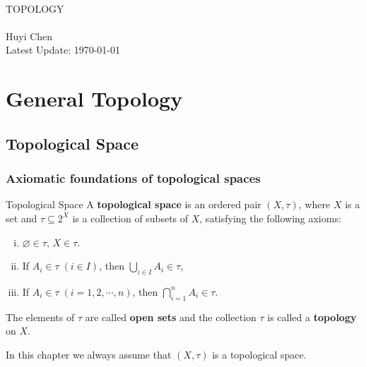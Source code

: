 \documentclass{report}
\begin{document}
\begin{titlepage}
	\begin{center}
		~\\
		\vspace{6em}
		\textsc{\Huge TOPOLOGY}
		~\\
		\vspace{2.5em}
		{\Large }
		~\\
		\vspace{6em}
		\textsf{Huyi Chen}
		~\\
		\vspace{5in}
		{\large Latest Update: \today}
	\end{center}
\end{titlepage}

\tableofcontents
\thispagestyle{empty}

\chapter{General Topology}
\thispagestyle{empty}
\setcounter{page}{1}

\section{Topological Space}
\subsection{Axiomatic foundations of topological spaces}
\begin{definition}{Topological Space}{}
	A \textbf{topological space} is an ordered pair $(X,\tau)$, where $X$ is a set and $\tau\subseteq2^X $ is a collection of subsets of $X$, satisfying the following axioms:
	\begin{enumerate}[(i)]
		\item $\varnothing\in \tau$, $X\in \tau$.
		\item If $A_i\in\tau\;(i\in I)$, then $\bigcup\limits_{i\in I}A_i\in \tau$,
		\item If $A_i\in\tau\;(i=1,2,\cdots,n)$, then $\bigcap\limits_{i=1}^nA_i\in \tau$.
	\end{enumerate}
	\noindent The elements of $\tau$ are called \textbf{open sets} and the collection $\tau$ is called a \textbf{topology} on $X$.
\end{definition}


\noindent In this chapter we always assume that $(X,\tau)$ is a topological space.
\end{document}
